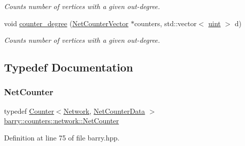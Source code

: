 \begin{Indent}
\begin{DoxyCompactItemize}
\begin{DoxyCompactList}\small\item\em Counts number of vertices with a given out-\/degree. \end{DoxyCompactList}\item 
void \hyperlink{namespacebarry_1_1counters_1_1network_a8c7ef19041094ac55a17106940c7d244}{counter\+\_\+degree} (\hyperlink{namespacebarry_1_1counters_1_1network_a3b3c590303d47840d1967372ae495d95}{Net\+Counter\+Vector} $\ast$counters, std\+::vector$<$ \hyperlink{namespacebarry_a11dfc53ddb4672278319aa04f1e09a6c}{uint} $>$ d)
\begin{DoxyCompactList}\small\item\em Counts number of vertices with a given out-\/degree. \end{DoxyCompactList}\end{DoxyCompactItemize}
\end{Indent}


\subsection{Typedef Documentation}
\mbox{\label{namespacebarry_1_1counters_1_1network_a067bd9de04608fc2e1586324d3864a45}} 
\subsubsection{\texorpdfstring{Net\+Counter}{NetCounter}}
{\footnotesize\ttfamily typedef \hyperlink{classbarry_1_1_counter}{Counter}$<$\hyperlink{namespacebarry_1_1counters_1_1network_a4cb88d4572ded3b447ea269c9cd0b2c0}{Network}, \hyperlink{classbarry_1_1counters_1_1network_1_1_net_counter_data}{Net\+Counter\+Data} $>$ \hyperlink{namespacebarry_1_1counters_1_1network_a067bd9de04608fc2e1586324d3864a45}{barry\+::counters\+::network\+::\+Net\+Counter}}



Definition at line 75 of file barry.\+hpp.

\mbox{\label{namespacebarry_1_1counters_1_1network_a3b3c590303d47840d1967372ae495d95}} 
